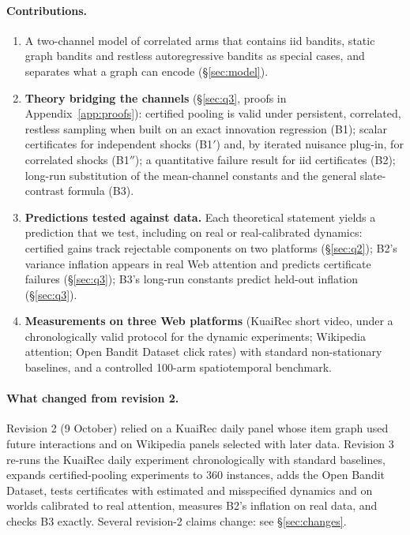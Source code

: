 \documentclass[11pt]{article}
\theoremstyle{definition}
\theoremstyle{remark}
\begin{document}
\paragraph{Contributions.}
\begin{enumerate}
\item A two-channel model of correlated arms that contains iid bandits, static graph bandits and restless autoregressive bandits as special cases, and separates what a graph can encode (\S\ref{sec:model}).
\item \textbf{Theory bridging the channels} (\S\ref{sec:q3}, proofs in Appendix~\ref{app:proofs}): certified pooling is valid under persistent, correlated, restless sampling when built on an exact innovation regression (B1); scalar certificates for independent shocks (B1$'$) and, by iterated nuisance plug-in, for correlated shocks (B1$''$); a quantitative failure result for iid certificates (B2); long-run substitution of the mean-channel constants and the general slate-contrast formula (B3).
\item \textbf{Predictions tested against data.} Each theoretical statement yields a prediction that we test, including on real or real-calibrated dynamics: certified gains track rejectable components on two platforms (\S\ref{sec:q2}); B2's variance inflation appears in real Web attention and predicts certificate failures (\S\ref{sec:q3}); B3's long-run constants predict held-out inflation (\S\ref{sec:q3}).
\item \textbf{Measurements on three Web platforms} (KuaiRec short video, under a chronologically valid protocol for the dynamic experiments; Wikipedia attention; Open Bandit Dataset click rates) with standard non-stationary baselines, and a controlled 100-arm spatiotemporal benchmark.
\end{enumerate}

\paragraph{What changed from revision 2.} Revision 2 (9 October) relied on a KuaiRec daily panel whose item graph used future interactions and on Wikipedia panels selected with later data. Revision 3 re-runs the KuaiRec daily experiment chronologically with standard baselines, expands certified-pooling experiments to 360 instances, adds the Open Bandit Dataset, tests certificates with estimated and misspecified dynamics and on worlds calibrated to real attention, measures B2's inflation on real data, and checks B3 exactly. Several revision-2 claims change: see \S\ref{sec:changes}.
\end{document}
